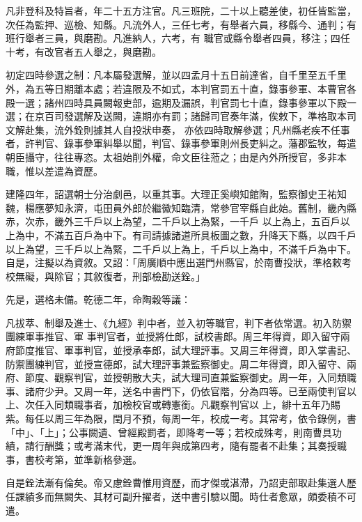 \begin{pinyinscope}
 凡非登科及特旨者，年二十五方注官。凡三班院，二十以上聽差使，初任皆監當，次任為監押、巡檢、知縣。凡流外人，三任七考，有舉者六員，移縣今、通判；有班行舉者三員，與磨勘。凡進納人，六考，有
 職官或縣令舉者四員，移注；四任十考，有改官者五人舉之，與磨勘。



 初定四時參選之制：凡本屬發選解，並以四孟月十五日前達省，自千里至五千里外，為五等日期離本處；若違限及不如式，本判官罰五十直，錄事參軍、本曹官各殿一選；諸州四時具員闕報吏部，逾期及漏誤，判官罰七十直，錄事參軍以下殿一選；在京百司發選解及送闕，違期亦有罰；諸歸司官奏年滿，俟敕下，準格取本司文解赴集，流外銓則據其人自投狀申奏，
 亦依四時取解參選；凡州縣老疾不任事者，許判官、錄事參軍糾舉以聞，判官、錄事參軍則州長吏糾之。藩郡監牧，每遣朝臣攝守，往往專恣。太祖始削外權，命文臣往蒞之；由是內外所授官，多非本職，惟以差遣為資歷。



 建隆四年，詔選朝士分治劇邑，以重其事。大理正奚嶼知館陶，監察御史王祐知魏，楊應夢知永濟，屯田員外郎於繼徽知臨清，常參官宰縣自此始。舊制，畿內縣赤，次赤，畿外三千戶以上為望，二千戶以上為緊，一千戶
 以上為上，五百戶以上為中，不滿五百戶為中下。有司請據諸道所具板圖之數，升降天下縣，以四千戶以上為望，三千戶以上為緊，二千戶以上為上，千戶以上為中，不滿千戶為中下。自是，注擬以為資敘。又詔：「周廣順中應出選門州縣官，於南曹投狀，準格敕考校無礙，與除官；其敘復者，刑部檢勘送銓。」



 先是，選格未備。乾德二年，命陶穀等議：



 凡拔萃、制舉及進士、《九經》判中者，並入初等職官，判下者依常選。初入防禦團練軍事推官、軍
 事判官者，並授將仕郎，試校書郎。周三年得資，即入留守兩府節度推官、軍事判官，並授承奉郎，試大理評事。又周三年得資，即入掌書記、防禦團練判官，並授宣德郎，試大理評事兼監察御史。周二年得資，即入留守、兩府、節度、觀察判官，並授朝散大夫，試大理司直兼監察御史。周一年，入同類職事、諸府少尹。又周一年，送名中書門下，仍依官階，分為四等。已至兩使判官以上、次任入同類職事者，加檢校官或轉憲銜。凡觀察判官以
 上，緋十五年乃賜紫。每任以周三年為限，閏月不預，每周一年，校成一考。其常考，依令錄例，書「中」、「上」；公事闕遺、曾經殿罰者，即降考一等；若校成殊考，則南曹具功績，請行酬獎；或考滿末代，更一周年與成第四考，隨有罷者不赴集；其奏授職事，書校考第，並準新格參選。



 自是銓法漸有倫矣。帝又慮銓曹惟用資歷，而才傑或湛滯，乃詔吏部取赴集選人歷任課績多而無闕失、其材可副升擢者，送中書引驗以聞。時仕者愈眾，頗委積不可
 遣。




\end{pinyinscope}

